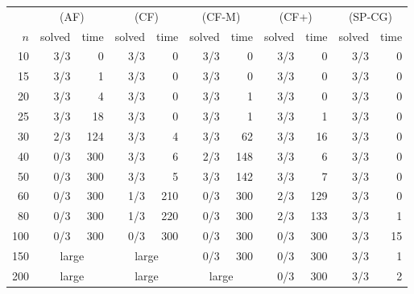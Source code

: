 \begin{tabular}{rrrrrrrrrrr}
\toprule
 & \multicolumn{2}{c}{(AF)} & \multicolumn{2}{c}{(CF)} & \multicolumn{2}{c}{(CF-M)} & \multicolumn{2}{c}{(CF+)} & \multicolumn{2}{c}{(SP-CG)} \\
\cmidrule(lr){2-3} \cmidrule(lr){4-5} \cmidrule(lr){6-7} \cmidrule(lr){8-9} \cmidrule(lr){10-11}
$n$ & solved & time & solved & time & solved & time & solved & time & solved & time \\
\midrule
10 & 3/3 & 0 & 3/3 & 0 & 3/3 & 0 & 3/3 & 0 & 3/3 & 0 \\
15 & 3/3 & 1 & 3/3 & 0 & 3/3 & 0 & 3/3 & 0 & 3/3 & 0 \\
20 & 3/3 & 4 & 3/3 & 0 & 3/3 & 1 & 3/3 & 0 & 3/3 & 0 \\
25 & 3/3 & 18 & 3/3 & 0 & 3/3 & 1 & 3/3 & 1 & 3/3 & 0 \\
30 & 2/3 & 124 & 3/3 & 4 & 3/3 & 62 & 3/3 & 16 & 3/3 & 0 \\
40 & 0/3 & 300 & 3/3 & 6 & 2/3 & 148 & 3/3 & 6 & 3/3 & 0 \\
50 & 0/3 & 300 & 3/3 & 5 & 3/3 & 142 & 3/3 & 7 & 3/3 & 0 \\
60 & 0/3 & 300 & 1/3 & 210 & 0/3 & 300 & 2/3 & 129 & 3/3 & 0 \\
80 & 0/3 & 300 & 1/3 & 220 & 0/3 & 300 & 2/3 & 133 & 3/3 & 1 \\
100 & 0/3 & 300 & 0/3 & 300 & 0/3 & 300 & 0/3 & 300 & 3/3 & 15 \\
150 & \multicolumn{2}{c}{large} & \multicolumn{2}{c}{large} & 0/3 & 300 & 0/3 & 300 & 3/3 & 1 \\
200 & \multicolumn{2}{c}{large} & \multicolumn{2}{c}{large} & \multicolumn{2}{c}{large} & 0/3 & 300 & 3/3 & 2 \\
\bottomrule
\end{tabular}
